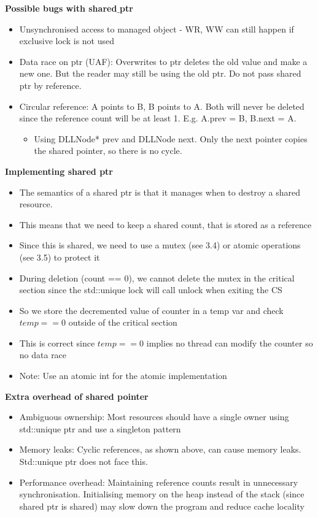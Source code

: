 \documentclass[10pt, landscape]{article}
\begin{document}
\begin{multicols}{4}
\textbf{Possible bugs with shared$\_$ptr} \\
\begin{itemize}
    \item Unsynchronised access to managed object - WR, WW can still happen if exclusive lock is not used 
    \item Data race on ptr (UAF): Overwrites to ptr deletes the old value and make a new one. But the reader may still be using the old ptr. Do not pass shared ptr by reference. 
    \item Circular reference: A points to B, B points to A. Both will never be deleted since the reference count will be at least 1. E.g. A.prev = B, B.next = A. 
    \begin{itemize}
        \item Using DLLNode* prev and DLLNode next. Only the next pointer copies the shared pointer, so there is no cycle.
    \end{itemize}
\end{itemize}

\textbf{Implementing shared ptr} \\
\begin{itemize}
    \item The semantics of a shared ptr is that it manages when to destroy a shared resource.
    \item This means that we need to keep a shared count, that is stored as a reference
    \item Since this is shared, we need to use a mutex (see 3.4) or atomic operations (see 3.5) to protect it
    \item During deletion (count == 0), we cannot delete the mutex in the critical section since the std::unique lock will call unlock when exiting the CS
    \item So we store the decremented value of counter in a temp var and check $temp==0$ outside of the critical section
    \item This is correct since $temp==0$ implies no thread can modify the counter so no data race
    \item Note: Use an atomic int for the atomic implementation
\end{itemize}

\textbf{Extra overhead of shared pointer} \\
\begin{itemize}
    \item Ambiguous ownership: Most resources should have a single owner using std::unique ptr and use a singleton pattern
    \item Memory leaks: Cyclic references, as shown above, can cause memory leaks. Std::unique ptr does not face this. 
    \item Performance overhead: Maintaining reference counts result in unnecessary synchronisation. Initialising memory on the heap instead of the stack (since shared ptr is shared) may slow down the program and reduce cache locality
\end{itemize}


\end{multicols}
\end{document}
